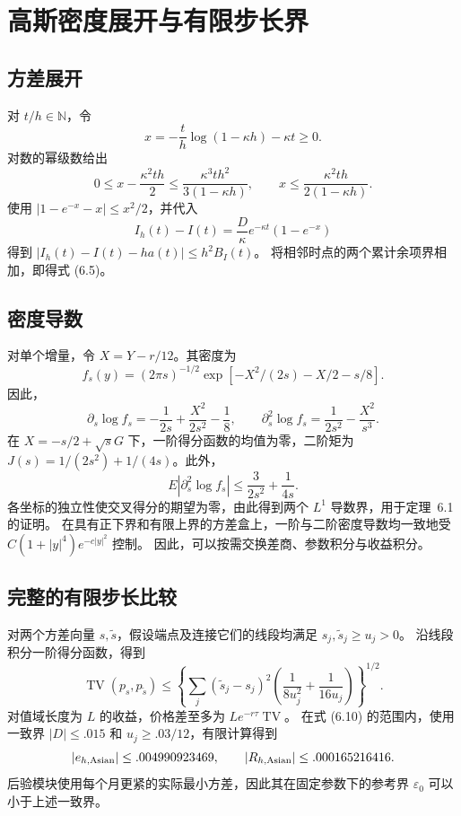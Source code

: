 \section{高斯密度展开与有限步长界}

\subsection{方差展开}

对 \(t/h\in\mathbb N\)，令
\[
x=-\frac th\log(1-\kappa h)-\kappa t\ge0.
\]
对数的幂级数给出
\[
0\le x-\frac{\kappa^2th}{2}
\le\frac{\kappa^3th^2}{3(1-\kappa h)},\qquad
x\le\frac{\kappa^2th}{2(1-\kappa h)}.
\]
使用 \(|1-e^{-x}-x|\le x^2/2\)，并代入
\[
I_h(t)-I(t)=\frac D\kappa e^{-\kappa t}(1-e^{-x})
\]
得到 \(|I_h(t)-I(t)-ha(t)|\le h^2B_I(t)\)。
将相邻时点的两个累计余项界相加，即得式 (6.5)。

\subsection{密度导数}

对单个增量，令 \(X=Y-r/12\)。其密度为
\[
f_s(y)=(2\pi s)^{-1/2}
\exp[-X^2/(2s)-X/2-s/8].
\]
因此，
\[
\partial_s\log f_s=-\frac1{2s}+\frac{X^2}{2s^2}-\frac18,\qquad
\partial_s^2\log f_s=\frac1{2s^2}-\frac{X^2}{s^3}.
\]
在 \(X=-s/2+\sqrt{s}G\) 下，一阶得分函数的均值为零，二阶矩为
\(J(s)=1/(2s^2)+1/(4s)\)。此外，
\[
E|\partial_s^2\log f_s|
\le\frac3{2s^2}+\frac1{4s}.
\]
各坐标的独立性使交叉得分的期望为零，由此得到两个 \(L^1\) 导数界，用于定理~6.1 的证明。
在具有正下界和有限上界的方差盒上，一阶与二阶密度导数均一致地受
\(C(1+|y|^4)e^{-c|y|^2}\) 控制。
因此，可以按需交换差商、参数积分与收益积分。

\subsection{完整的有限步长比较}

对两个方差向量 \(s,\tilde s\)，假设端点及连接它们的线段均满足 \(s_j,\tilde s_j\ge u_j>0\)。
沿线段积分一阶得分函数，得到
\[
\operatorname{TV}(p_s,p_{\tilde s})
\le\left\{
\sum_j(\tilde s_j-s_j)^2
\left(\frac1{8u_j^2}+\frac1{16u_j}\right)
\right\}^{1/2}.
\tag{D.1}
\]
对值域长度为 \(L\) 的收益，价格差至多为
\(Le^{-r\tau}\operatorname{TV}\)。
在式 (6.10) 的范围内，使用一致界 \(|D|\le.015\) 和 \(u_j\ge.03/12\)，有限计算得到
\[
|e_{h,\rm Asian}|\le.004990923469,\qquad
|R_{h,\rm Asian}|\le.000165216416.
\]
后验模块使用每个月更紧的实际最小方差，因此其在固定参数下的参考界 \(\varepsilon_0\) 可以小于上述一致界。

